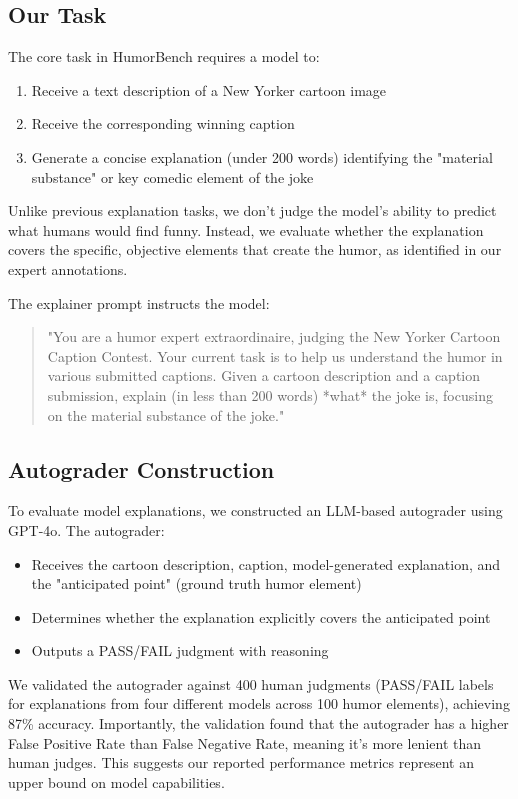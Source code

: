 \documentclass[twocolumn]{article}
\begin{document}
\subsection{Our Task}

The core task in HumorBench requires a model to:
\begin{enumerate}
    \item Receive a text description of a New Yorker cartoon image
    \item Receive the corresponding winning caption
    \item Generate a concise explanation (under 200 words) identifying the "material substance" or key comedic element of the joke
\end{enumerate}

Unlike previous explanation tasks, we don't judge the model's ability to predict what humans would find funny. Instead, we evaluate whether the explanation covers the specific, objective elements that create the humor, as identified in our expert annotations.

The explainer prompt instructs the model:
\begin{quote}
"You are a humor expert extraordinaire, judging the New Yorker Cartoon Caption Contest. Your current task is to help us understand the humor in various submitted captions. Given a cartoon description and a caption submission, explain (in less than 200 words) *what* the joke is, focusing on the material substance of the joke."
\end{quote}

\subsection{Autograder Construction}

To evaluate model explanations, we constructed an LLM-based autograder using GPT-4o. The autograder:
\begin{itemize}
    \item Receives the cartoon description, caption, model-generated explanation, and the "anticipated point" (ground truth humor element)
    \item Determines whether the explanation explicitly covers the anticipated point
    \item Outputs a PASS/FAIL judgment with reasoning
\end{itemize}

We validated the autograder against 400 human judgments (PASS/FAIL labels for explanations from four different models across 100 humor elements), achieving 87\% accuracy. Importantly, the validation found that the autograder has a higher False Positive Rate than False Negative Rate, meaning it's more lenient than human judges. This suggests our reported performance metrics represent an upper bound on model capabilities.
\end{document}
